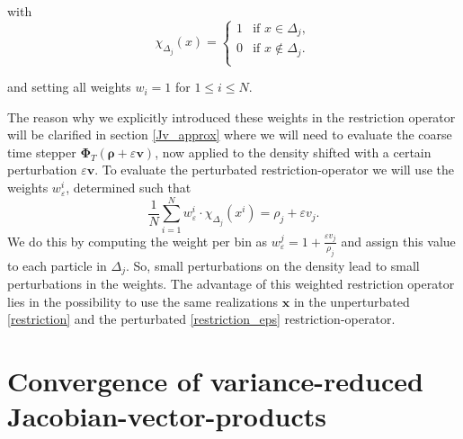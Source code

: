 \documentclass[]{article}
\newcommand{\U}{\ensuremath{\boldsymbol{\rho}}}
\newcommand{\cts}{\ensuremath{\boldsymbol{\Phi}_T}} %
\begin{document}
with 
\begin{equation}
\chi_{\Delta_j}(x) = \begin{cases}
  1 & \mbox{if } x \in \Delta_j, \\
  0 & \mbox{if } x \notin \Delta_j. \\
\end{cases}
\end{equation}


and setting all weights $w_i =1 $ for $1\leq i \leq N$.


The reason why we explicitly introduced these weights in the restriction operator will be clarified in section \ref{Jv_approx} where we will need to evaluate  the coarse time stepper  $\cts (\U + \varepsilon \mathbf{v})$, now applied to the density shifted with a certain perturbation $\varepsilon \mathbf{v}$. %
To evaluate the perturbated restriction-operator we will use the weights $ w^i_{\varepsilon}$, determined such that
\begin{equation}
\frac{1}{N} \sum_{i=1}^{N}  w^i_{\varepsilon} \cdot \chi_{\Delta_j} (x^i) = \rho_j + \varepsilon v_j . \label{restriction_eps}
\end{equation}
We do this by computing the weight per bin as $ w^j_{\varepsilon} = 1+ \frac{\varepsilon v_j}{\rho_j}$ and assign this value to each particle in $\Delta_j$. So, small perturbations on the density lead to small perturbations in the weights. The advantage of this weighted restriction operator lies in the possibility to use the same realizations $\mathbf{x}$ in the unperturbated \eqref{restriction} and the perturbated  \eqref{restriction_eps} restriction-operator.




\section{Convergence of variance-reduced Jacobian-vector-products}
\end{document}
